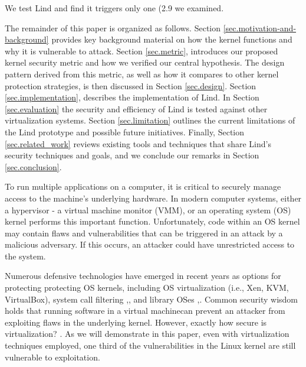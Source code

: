 \item
We test Lind and find it triggers only one (2.9%
we examined.

The remainder of this paper is organized as follows.
Section \ref{sec.motivation-and-background} provides key background material on
how the kernel functions and why it is vulnerable to attack.
Section \ref{sec.metric}, introduces our proposed kernel security metric and how
we verified our central hypothesis. The
design pattern derived from this metric, as well as how it compares to other kernel
protection strategies,
is then discussed in Section \ref{sec.design}. Section \ref{sec.implementation},
describes the implementation of Lind. In Section \ref{sec.evaluation} the security and
efficiency of Lind is tested against other virtualization systems.
Section \ref{sec.limitation} outlines the current
limitations of the Lind prototype and possible future initiatives.
Finally, Section \ref{sec.related_work} reviews existing tools and techniques that share
Lind's security techniques and goals, and we conclude our remarks in
Section \ref{sec.conclusion}.




To run multiple applications on a computer, it is critical to securely
manage access to the machine's underlying hardware.
In modern computer systems, either a hypervisor - a virtual machine monitor (VMM), or an
operating system (OS) kernel performs this important function. Unfortunately, code within an OS kernel
may contain flaws and vulnerabilities that can be triggered in an attack by a malicious adversary.
If this occurs, an attacker could have unrestricted access to the system.


Numerous defensive technologies have emerged in recent years as options for protecting
protecting OS kernels, including OS virtualization (i.e., Xen,
 KVM, VirtualBox), system call filtering \cite{Janus:99},\cite{SCI-04},
and library OSes \cite{Bascule},\cite{Drawbridge-11}.
Common security wisdom holds that running software in a
virtual machinecan prevent an attacker from exploiting flaws in the underlying
kernel. However, exactly how secure is virtualization? \cite{Tal}. As we will
demonstrate in this paper, even with virtualization techniques employed, one
third of the vulnerabilities in the Linux kernel are still vulnerable to exploitation.

